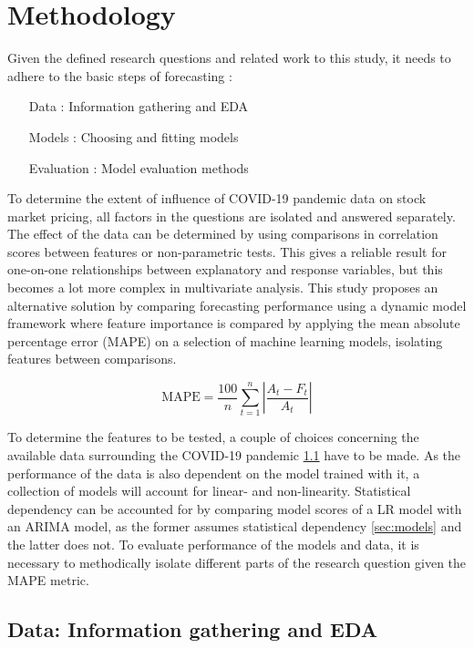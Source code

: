 \section{Methodology}
\label{sec:meth}

Given the defined research questions and related work to this study, it needs to adhere to the basic steps of forecasting \cite{hyndman2018forecasting, davydenko2021forecast}:

\begin{itemize}
    \item[Data]: Information gathering and EDA
    \item[Models]: Choosing and fitting models
    \item[Evaluation]: Model evaluation methods
\end{itemize}

To determine the extent of influence of COVID-19 pandemic data on stock market pricing, all factors in the questions are isolated and answered separately. The effect of the data can be determined by using comparisons in correlation scores between features or non-parametric tests. This gives a reliable result for one-on-one relationships between explanatory and response variables, but this becomes a lot more complex in multivariate analysis. This study proposes an alternative solution by comparing forecasting performance using a dynamic model framework where feature importance is compared by applying the mean absolute percentage error (MAPE) on a selection of machine learning models, isolating features between comparisons.

$$\mbox{MAPE} = \frac{100}{n}\sum_{t=1}^n  \left|\frac{A_t-F_t}{A_t}\right|$$

To determine the features to be tested, a couple of choices concerning the available data surrounding the COVID-19 pandemic \ref{sec:data} have to be made. As the performance of the data is also dependent on the model trained with it, a collection of models will account for linear- and non-linearity. Statistical dependency can be accounted for by comparing model scores of a LR model with an ARIMA model, as the former assumes statistical dependency \ref{sec:models} and the latter does not. To evaluate performance of the models and data, it is necessary to methodically isolate different parts of the research question given the MAPE metric.

\subsection{Data: Information gathering and EDA}
\label{sec:data}

